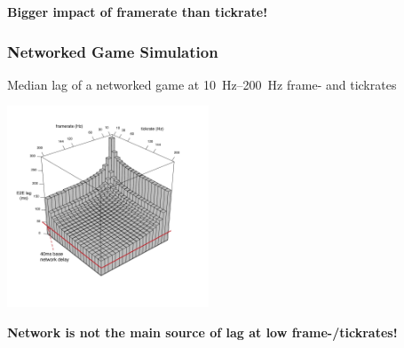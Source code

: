 \documentclass{UDEbeamerEN}
\begin{document}
\begin{frame}
\begin{overprint}
{\begin{center}
				\textbf{Bigger impact of framerate than tickrate!}

			\end{center}}
	\end{overprint}


\end{frame}


\begin{frame}
	\frametitle{Networked Game Simulation}

	\begin{center}
	\vspace{-9mm}
		Median lag of a networked game at \SIrange{10}{200}{\hertz} frame- and tickrates%

		\includegraphics[height=6cm]{extras/e2e-lag-3dbars-annotated.pdf}
		\vspace{-10mm}

		\textbf{Network is not the main source of lag at low frame-/tickrates!}

	\end{center}

\end{frame}
\end{document}
